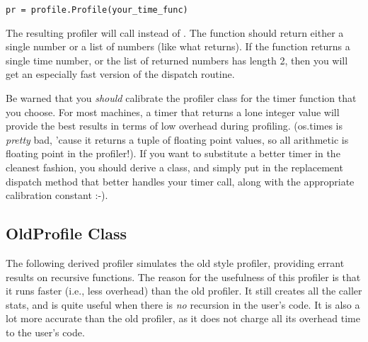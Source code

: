 \bcode\begin{verbatim}
pr = profile.Profile(your_time_func)
\end{verbatim}\ecode
%
The resulting profiler will call  instead of
.  The function should return either a single number
or a list of numbers (like what  returns).  If the
function returns a single time number, or the list of returned numbers
has length 2, then you will get an especially fast version of the
dispatch routine.

Be warned that you \emph{should} calibrate the profiler class for the
timer function that you choose.  For most machines, a timer that
returns a lone integer value will provide the best results in terms of
low overhead during profiling.  (os.times is \emph{pretty} bad, 'cause
it returns a tuple of floating point values, so all arithmetic is
floating point in the profiler!).  If you want to substitute a
better timer in the cleanest fashion, you should derive a class, and
simply put in the replacement dispatch method that better handles your
timer call, along with the appropriate calibration constant :-).


\subsection{OldProfile Class}

The following derived profiler simulates the old style profiler,
providing errant results on recursive functions. The reason for the
usefulness of this profiler is that it runs faster (i.e., less
overhead) than the old profiler.  It still creates all the caller
stats, and is quite useful when there is \emph{no} recursion in the
user's code.  It is also a lot more accurate than the old profiler, as
it does not charge all its overhead time to the user's code.

